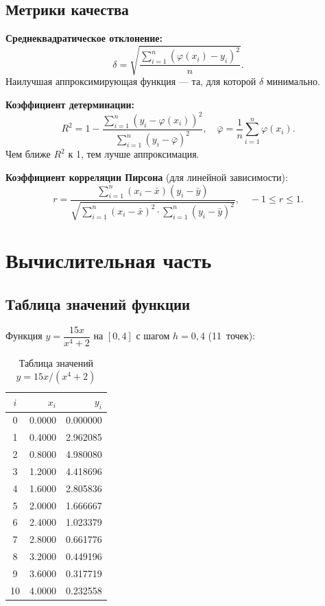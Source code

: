 \documentclass[a4paper,12pt]{article}
\begin{document}
\subsection{Метрики качества}

\textbf{Среднеквадратическое отклонение:}
\[
    \delta = \sqrt{\frac{\sum_{i=1}^{n}(\varphi(x_i) - y_i)^2}{n}}.
\]
Наилучшая аппроксимирующая функция — та, для которой $\delta$ минимально.

\textbf{Коэффициент детерминации:}
\[
    R^2 = 1 - \frac{\displaystyle\sum_{i=1}^{n}(y_i - \varphi(x_i))^2}{\displaystyle\sum_{i=1}^{n}(y_i - \bar\varphi)^2}, \quad
    \bar\varphi = \frac{1}{n}\sum_{i=1}^{n}\varphi(x_i).
\]
Чем ближе $R^2$ к 1, тем лучше аппроксимация.

\textbf{Коэффициент корреляции Пирсона} (для линейной зависимости):
\[
    r = \frac{\sum_{i=1}^n(x_i - \bar x)(y_i - \bar y)}
             {\sqrt{\sum_{i=1}^n(x_i-\bar x)^2 \cdot \sum_{i=1}^n(y_i-\bar y)^2}}, \quad -1 \le r \le 1.
\]

\section{Вычислительная часть}

\subsection{Таблица значений функции}

Функция $y = \dfrac{15x}{x^4+2}$ на $[0,4]$ с шагом $h=0{,}4$ (11~точек):

\begin{table}[H]
\centering
\begin{tabular}{|c|r|r|}
\hline
$i$ & $x_i$ & $y_i$ \\
\hline
0 & 0.0000 & 0.000000 \\
1 & 0.4000 & 2.962085 \\
2 & 0.8000 & 4.980080 \\
3 & 1.2000 & 4.418696 \\
4 & 1.6000 & 2.805836 \\
5 & 2.0000 & 1.666667 \\
6 & 2.4000 & 1.023379 \\
7 & 2.8000 & 0.661776 \\
8 & 3.2000 & 0.449196 \\
9 & 3.6000 & 0.317719 \\
10 & 4.0000 & 0.232558 \\
\hline
\end{tabular}
\caption{Таблица значений $y = 15x/(x^4+2)$}
\end{table}
\end{document}
